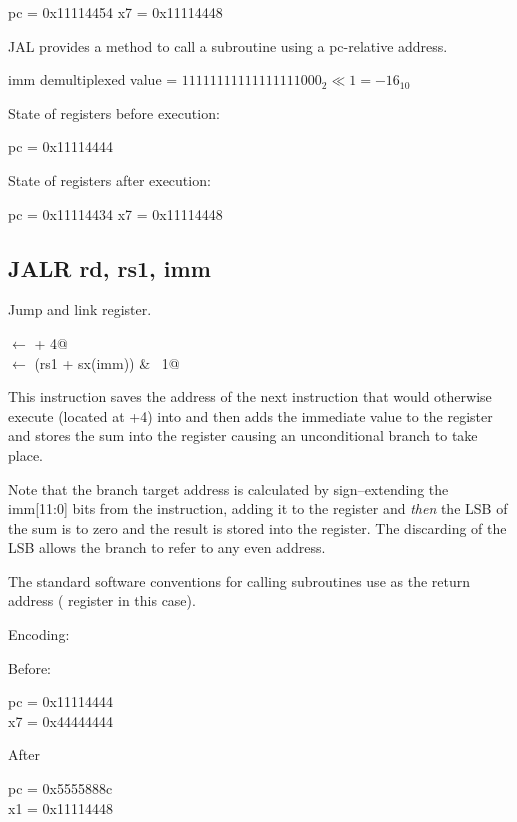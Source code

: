 pc = 0x11114454
x7 = 0x11114448

JAL provides a method to call a subroutine using a pc-relative address.



imm demultiplexed value = $11111111111111111000_2 \ll 1 = -16_{10}$

State of registers before execution:

pc = 0x11114444

State of registers after execution:

pc = 0x11114434
x7 = 0x11114448


\subsection{JALR rd, rs1, imm}

Jump and link register.

\verb@rd@ $\leftarrow$ \verb@pc + 4@\\
\verb@pc@ $\leftarrow$ \verb@(rs1 + sx(imm)) & ~1@

This instruction saves the address of the next instruction
that would otherwise execute (located at +4) into 
 and then adds the immediate value to the  
register and stores the sum into the  register causing
an unconditional branch to take place.

Note that the branch target address is calculated by 
sign--extending the imm[11:0] bits from the instruction, 
adding it to the  register and {\em then} the 
LSB of the sum is to zero and the result is stored into the 
 register.
The discarding of the LSB allows the branch to refer to any 
even address.

The standard software conventions for calling subroutines
use  as the return address ( register in this 
case).~\cite[p.~16]{rvismv1v22:2017}


Encoding:


Before:

pc = 0x11114444\\
x7 = 0x44444444

After

pc = 0x5555888c\\
x1 = 0x11114448

